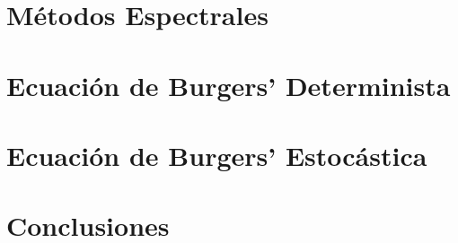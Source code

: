 \documentclass{beamer}
\begin{document}
\section{M\'etodos Espectrales}
	

\section{Ecuaci\'on de Burgers' Determinista}


\section{Ecuaci\'on de Burgers' Estoc\'astica}
  

\section{Conclusiones}
  
\end{document}
